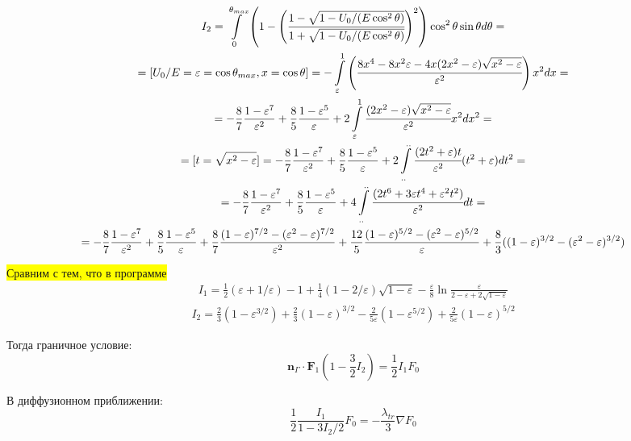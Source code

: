 \documentclass[a4paper,12pt]{article} %
\renewcommand{\vec}[1]{\bm{#1}}
\newcommand{\eps}{\varepsilon}
\begin{document}
\begin{equation}
\begin{gathered}
	I_2 = 
	\int\limits_{0}^{\theta_{max}}
	\left(1 - \Bigg(\cfrac{1 - \sqrt{1 - U_0/(E  \cos^2 \theta)}}{1 + \sqrt{1 - U_0/(E  \cos^2 \theta)}}\Bigg)^2\right) \cos^2 \theta \sin \theta d\theta = \\
	= [U_0/E = \eps = \cos \theta_{max}, x = \cos \theta] =
	-\int\limits_{\eps}^{1}\left(\cfrac{8x^4 - 8 x^2 \eps - 4 x (2 x^2 - \eps) \sqrt{x^2 - \eps}}{\eps^2}\right) x^2 dx
	= \\ =
	- \frac{8}{7} \frac{1 - \eps^7}{\eps^2} 
	+ \frac{8}{5} \frac{1 - \eps^5}{\eps}
	+ 2 \int\limits_{\eps}^{1}
	\cfrac{(2 x^2 - \eps) \sqrt{x^2 - \eps}}{\eps^2} x^2 dx^2 = \\ =
	[t = \sqrt{x^2 - \eps}] =
	- \frac{8}{7} \frac{1 - \eps^7}{\eps^2} 
	+ \frac{8}{5} \frac{1 - \eps^5}{\eps}
	+ 2 \int\limits_{..}^{..}
	\cfrac{(2 t^2 + \eps) t}{\eps^2} (t^2 + \eps) dt^2 = \\ =
	- \frac{8}{7} \frac{1 - \eps^7}{\eps^2} 
	+ \frac{8}{5} \frac{1 - \eps^5}{\eps}
	+ 4 \int\limits_{..}^{..}
	\cfrac{(2 t^6 + 3 \eps t^4 + \eps^2 t^2)}{\eps^2}  dt= \\ =
	- \frac{8}{7} \frac{1 - \eps^7}{\eps^2} 
	+ \frac{8}{5} \frac{1 - \eps^5}{\eps}
	+ \frac{8}{7} \frac{(1 - \eps)^{7/2} - (\eps^2 - \eps)^{7/2}}{\eps^2}
	+ \frac{12}{5} \frac{(1 - \eps)^{5/2} - (\eps^2 - \eps)^{5/2}}{\eps}
	+ \frac{8}{3} ((1 - \eps)^{3/2} - (\eps^2 - \eps)^{3/2})
\end{gathered}
\end{equation}

\colorbox{yellow}{Сравним с тем, что в программе}
\begin{gather*}
I_1 = 
\frac{1}{2} (\eps + 1/\eps) - 1 +
\frac{1}{4} (1 - 2/\eps)\sqrt{1 - \eps} -
\frac{\eps}{8} \ln \frac{\eps}{2 - \eps + 2 \sqrt{1 - \eps}}
\end{gather*}
\begin{gather*}
I_2 = 
\frac{2}{3} (1 -\eps^{3/2}) 
+ \frac{2}{3} (1 -\eps)^{3/2}
- \frac{2}{5 \eps} (1 -\eps^{5/2}) 
+ \frac{2}{5 \eps} (1 -\eps)^{5/2}
\end{gather*}

Тогда граничное условие:
\begin{equation}
	\vec{n}_\Gamma \cdot \vec{F}_1 \left(1 - \frac{3}{2} I_2 \right) = \frac{1}{2} I_1 F_0
\end{equation}

В диффузионном приближении:
\begin{equation}
	\frac{1}{2} \frac{I_1}{1 - 3 I_2/2} F_0 = -\frac{\lambda_{tr}}{3} \nabla F_0
\end{equation}
\end{document}
